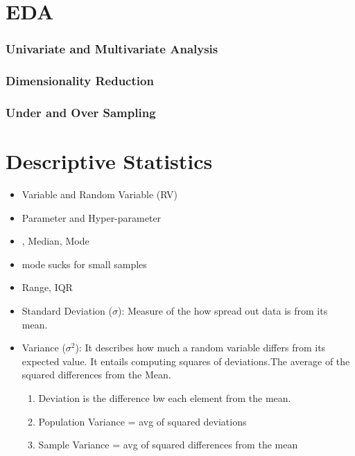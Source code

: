 \documentclass{beamer}
\begin{document}
\section{EDA}
\begin{frame}\frametitle{Univariate and Multivariate Analysis}
\end{frame}

\begin{frame}\frametitle{Dimensionality Reduction}
\end{frame}

\begin{frame}\frametitle{Under and Over Sampling}
\end{frame}


\section{Descriptive Statistics}



\begin{frame}%
\begin{itemize}
	\item Variable and Random Variable (RV)
	\item Parameter and Hyper-parameter
	\item \hyperlink{meanlabel}{}, Median, Mode
	\item mode sucks for small samples
	\item Range, IQR
	\item Standard Deviation ($\sigma$): Measure of the how spread out data is from its mean.
	\item Variance ($\sigma^2$): It describes how much a random variable differs from its expected value. It entails computing squares of deviations.The average of the squared differences from the Mean.\\
	\begin{enumerate}
		\item Deviation is the difference bw each element from the mean.\\
		\item Population Variance = avg of squared deviations\\
		\item Sample Variance = avg of squared differences from the mean
	\end{enumerate}
\end{itemize}
\end{frame}
\end{document}
